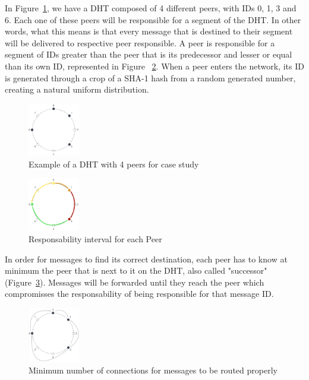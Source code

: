 In Figure~\ref{fig:c-2}, we have a DHT composed of 4 different peers, with IDs 0, 1, 3 and 6. Each one of these peers will be responsible for a segment of the DHT. In other words, what this means is that every message that is destined to their segment will be delivered to respective peer responsible. A peer is responsible for a segment of IDs greater than the peer that is its predecessor and lesser or equal than its own ID, represented in Figure ~\ref{fig:c-3}. When a peer enters the network, its ID is generated through a crop of a SHA-1 hash from a random generated number, creating a natural uniform distribution.

\begin{figure}[h!]
  \centering
  \includegraphics[width=0.2\textwidth]{figs/chord-2}
  \caption{Example of a DHT with 4 peers for case study}
  \label{fig:c-2}
\end{figure}

\begin{figure}[h!]
  \centering
  \includegraphics[width=0.2\textwidth]{figs/chord-3}
  \caption{Responsability interval for each Peer}
  \label{fig:c-3}
\end{figure}

In order for messages to find its correct destination, each peer has to know at minimum the peer that is next to it on the DHT, also called "successor" (Figure~\ref{fig:c-4}). Messages will be forwarded until they reach the peer which compromisses the responsability of being responsible for that message ID.

\begin{figure}[h!]
  \centering
  \includegraphics[width=0.2\textwidth]{figs/chord-4}
  \caption{Minimum number of connections for messages to be routed properly}
  \label{fig:c-4}
\end{figure}

